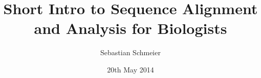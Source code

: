 \title{Short Intro to Sequence Alignment and Analysis for Biologists}
\author{Sebastian Schmeier}
\date{20th May 2014}
\maketitle
